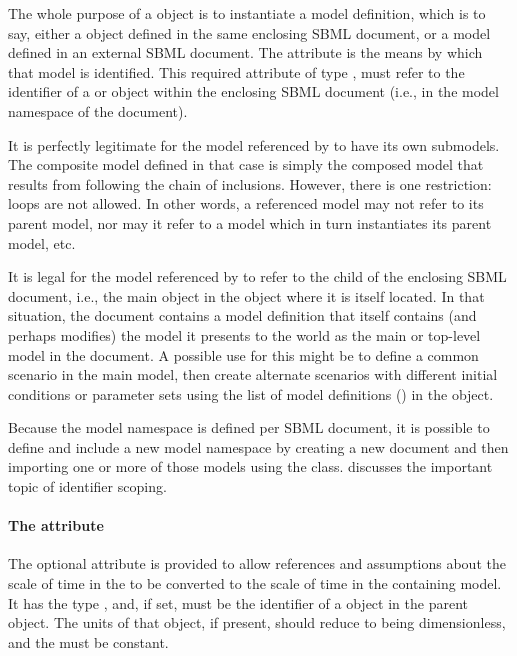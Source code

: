 The whole purpose of a \Submodel object is to instantiate a model definition, which is to say, either a \Model object defined in the same enclosing SBML document, or a model defined in an external SBML document.  The  attribute is the means by which that model is identified.  This required attribute of type , must refer to the identifier of a \Model or \ExternalModelDefinition object within the enclosing SBML document (i.e., in the model namespace of the document).

It is perfectly legitimate for the model referenced by  to have its own submodels.  The composite model defined in that case is simply the composed model that results from following the chain of inclusions.  However, there is one restriction: loops are not allowed. In other words, a referenced model may not refer to its parent model, nor may it refer to a model which in turn instantiates its parent model, etc.

It is legal for the model referenced by  to refer to the  child of the enclosing SBML document, i.e., the main \Model object in the \SBML object where it is itself located.  In that situation, the document contains a model definition that itself contains (and perhaps modifies) the model it presents to the world as the main or top-level model in the document.  A possible use for this might be to define a common scenario in the main model, then create alternate scenarios with different initial conditions or parameter sets using the list of model definitions () in the \SBML object.

Because the model namespace is defined per SBML document, it is possible to define and include a new model namespace by creating a new document and then importing one or more of those models using the \ExternalModelDefinition class.   discusses the important topic of identifier scoping.


\paragraph{The \fixttspace{} attribute}
\label{submodel-timeconversionfactor}

The optional  attribute is provided to allow references and assumptions about the scale of time in the \Submodel to be converted to  the scale of time in the containing model.  It has the type , and, if set, must be the identifier of a \Parameter object in the  parent \Model object.  The units of that \Parameter object, if present, should reduce to being dimensionless, and the \Parameter must be constant.

